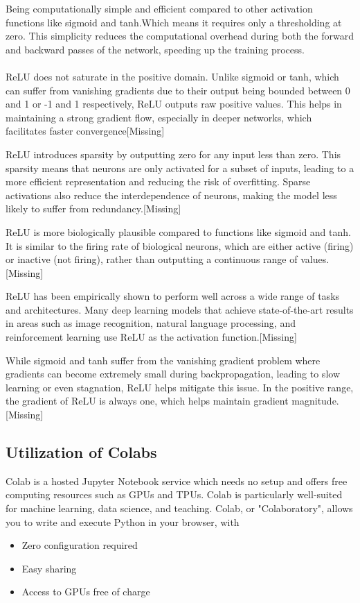 \documentclass[conference]{IEEEtran}
\begin{document}
Being computationally simple and efficient compared to other activation functions like sigmoid and tanh.Which means it requires only a thresholding at zero. This simplicity reduces the computational overhead during both the forward and backward passes of the network, speeding up the training process.
\\
\\
ReLU does not saturate in the positive domain. Unlike sigmoid or tanh, which can suffer from vanishing gradients due to their output being bounded between 0 and 1 or -1 and 1 respectively, ReLU outputs raw positive values. This helps in maintaining a strong gradient flow, especially in deeper networks, which facilitates faster convergence[Missing]

ReLU introduces sparsity by outputting zero for any input less than zero. This sparsity means that neurons are only activated for a subset of inputs, leading to a more efficient representation and reducing the risk of overfitting. Sparse activations also reduce the interdependence of neurons, making the model less likely to suffer from redundancy.[Missing]

ReLU is more biologically plausible compared to functions like sigmoid and tanh. It is similar to the firing rate of biological neurons, which are either active (firing) or inactive (not firing), rather than outputting a continuous range of values.[Missing]

ReLU has been empirically shown to perform well across a wide range of tasks and architectures. Many deep learning models that achieve state-of-the-art results in areas such as image recognition, natural language processing, and reinforcement learning use ReLU as the activation function.[Missing]

While sigmoid and tanh suffer from the vanishing gradient problem where gradients can become extremely small during backpropagation, leading to slow learning or even stagnation, ReLU helps mitigate this issue. In the positive range, the gradient of ReLU is always one, which helps maintain gradient magnitude.[Missing]

\subsection{Utilization of Colabs}
Colab is a hosted Jupyter Notebook service which needs no setup and offers free computing resources such as GPUs and TPUs. Colab is particularly well-suited for machine learning, data science, and teaching.
Colab, or "Colaboratory", allows you to write and execute Python in your browser, with
\begin{itemize}
    \item Zero configuration required
    \item Easy sharing
    \item Access to GPUs free of charge
\end{itemize}
\end{document}

